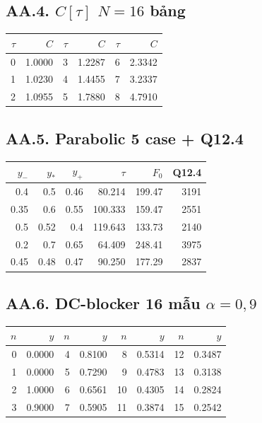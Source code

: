 \subsection*{AA.4. $C[\tau]$ $N=16$ bảng}
\begin{center}\scriptsize\begin{tabular}{@{}rrrrrr@{}}
\toprule $\tau$ & $C$ & $\tau$ & $C$ & $\tau$ & $C$ \\ \midrule
0 & 1.0000 & 3 & 1.2287 & 6 & 2.3342 \\
1 & 1.0230 & 4 & 1.4455 & 7 & 3.2337 \\
2 & 1.0955 & 5 & 1.7880 & 8 & 4.7910 \\
\bottomrule\end{tabular}\end{center}
\subsection*{AA.5. Parabolic 5 case + Q12.4}
\begin{center}\small\begin{tabular}{@{}rrrrrr@{}}
\toprule $y_-$ & $y_*$ & $y_+$ & $\tau$ & $F_0$ & Q12.4 \\ \midrule
0.4 & 0.5 & 0.46 & 80.214 & 199.47 & 3191 \\
0.35 & 0.6 & 0.55 & 100.333 & 159.47 & 2551 \\
0.5 & 0.52 & 0.4 & 119.643 & 133.73 & 2140 \\
0.2 & 0.7 & 0.65 & 64.409 & 248.41 & 3975 \\
0.45 & 0.48 & 0.47 & 90.250 & 177.29 & 2837 \\
\bottomrule\end{tabular}\end{center}
\subsection*{AA.6. DC-blocker 16 mẫu $\alpha=0{,}9$}
\begin{center}\scriptsize\begin{tabular}{@{}rrrrrrrr@{}}
\toprule $n$ & $y$ & $n$ & $y$ & $n$ & $y$ & $n$ & $y$ \\ \midrule
0 & 0.0000 & 4 & 0.8100 & 8 & 0.5314 & 12 & 0.3487 \\
1 & 0.0000 & 5 & 0.7290 & 9 & 0.4783 & 13 & 0.3138 \\
2 & 1.0000 & 6 & 0.6561 & 10 & 0.4305 & 14 & 0.2824 \\
3 & 0.9000 & 7 & 0.5905 & 11 & 0.3874 & 15 & 0.2542 \\
\bottomrule\end{tabular}\end{center}

